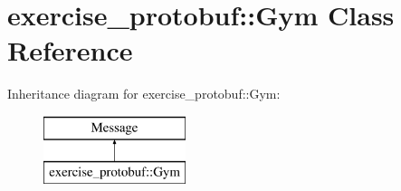 \hypertarget{classexercise__protobuf_1_1_gym}{}\section{exercise\+\_\+protobuf\+:\+:Gym Class Reference}
\label{classexercise__protobuf_1_1_gym}
Inheritance diagram for exercise\+\_\+protobuf\+:\+:Gym\+:\begin{figure}[H]
\begin{center}
\leavevmode
\includegraphics[height=2.000000cm]{classexercise__protobuf_1_1_gym}
\end{center}
\end{figure}
